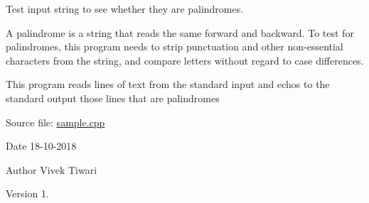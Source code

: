 Test input string to see whether they are palindromes.

A palindrome is a string that reads the same forward and backward. To test for palindromes, this program needs to strip punctuation and other non-\/essential characters from the string, and compare letters without regard to case differences.

This program reads lines of text from the standard input and echos to the standard output those lines that are palindromes

Source file\+: \hyperlink{sample_8cpp}{sample.\+cpp}

\begin{DoxyDate}{Date}
18-\/10-\/2018 
\end{DoxyDate}
\begin{DoxyAuthor}{Author}
Vivek Tiwari 
\end{DoxyAuthor}
\begin{DoxyVersion}{Version}
1. 
\end{DoxyVersion}
